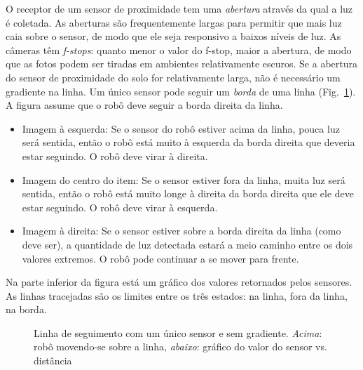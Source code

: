 O receptor de um sensor de proximidade tem uma \emph{abertura} através da qual a luz é coletada. As aberturas são frequentemente largas para permitir que mais luz caia sobre o sensor, de modo que ele seja responsivo a baixos níveis de luz. As câmeras têm \emph{f-stops}: quanto menor o valor do f-stop, maior a abertura, de modo que as fotos podem ser tiradas em ambientes relativamente escuros. Se a abertura do sensor de proximidade do solo for relativamente larga, não é necessário um gradiente na linha. Um único sensor pode seguir um \emph{borda} de uma linha (Fig.~\ref{fig.no-gradient}). A figura assume que o robô deve seguir a borda direita da linha.
\begin{itemize}
\item Imagem à esquerda: Se o sensor do robô estiver acima da linha, pouca luz será sentida, então o robô está muito à esquerda da borda direita que deveria estar seguindo. O robô deve virar à direita.
\item Imagem do centro do item: Se o sensor estiver fora da linha, muita luz será sentida, então o robô está muito longe à direita da borda direita que ele deve estar seguindo. O robô deve virar à esquerda.
\item Imagem à direita: Se o sensor estiver sobre a borda direita da linha (como deve ser), a quantidade de luz detectada estará a meio caminho entre os dois valores extremos. O robô pode continuar a se mover para frente.
\end{itemize}
Na parte inferior da figura está um gráfico dos valores retornados pelos sensores. As linhas tracejadas são os limites entre os três estados: na linha, fora da linha, na borda.

\begin{figure}
\begin{center}
\caption{Linha de seguimento com um único sensor e sem gradiente. \textit{Acima}: robô movendo-se sobre a linha, \textit{abaixo}: gráfico do valor do sensor vs. distância}\label{fig.no-gradient}
\end{center}
\end{figure}

